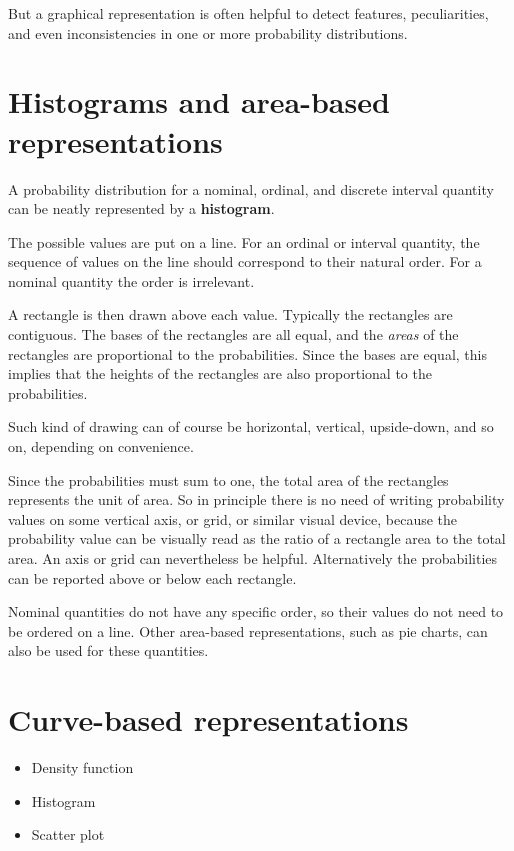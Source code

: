\documentclass[
  a4paper,
  DIV=11,
  numbers=noendperiod,
  oneside]{scrreprt}
\begin{document}
But a graphical representation is often helpful to detect features,
peculiarities, and even inconsistencies in one or more probability
distributions.

\hypertarget{histograms-and-area-based-representations}{%
\section{Histograms and area-based
representations}\label{histograms-and-area-based-representations}}

A probability distribution for a nominal, ordinal, and discrete interval
quantity can be neatly represented by a {\textbf{histogram}}.

The possible values are put on a line. For an ordinal or interval
quantity, the sequence of values on the line should correspond to their
natural order. For a nominal quantity the order is irrelevant.

A rectangle is then drawn above each value. Typically the rectangles are
contiguous. The bases of the rectangles are all equal, and the
{\emph{areas}} of the rectangles are proportional to the probabilities.
Since the bases are equal, this implies that the heights of the
rectangles are also proportional to the probabilities.

Such kind of drawing can of course be horizontal, vertical, upside-down,
and so on, depending on convenience.

Since the probabilities must sum to one, the total area of the
rectangles represents the unit of area. So in principle there is no need
of writing probability values on some vertical axis, or grid, or similar
visual device, because the probability value can be visually read as the
ratio of a rectangle area to the total area. An axis or grid can
nevertheless be helpful. Alternatively the probabilities can be reported
above or below each rectangle.

Nominal quantities do not have any specific order, so their values do
not need to be ordered on a line. Other area-based representations, such
as pie charts, can also be used for these quantities.

\hypertarget{curve-based-representations}{%
\section{Curve-based
representations}\label{curve-based-representations}}

\begin{itemize}
\item
  Density function
\item
  Histogram
\item
  Scatter plot
\end{itemize}
\end{document}
